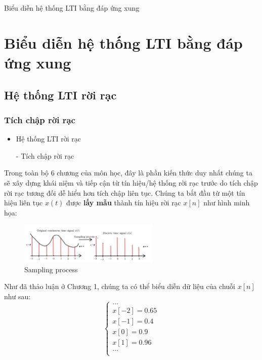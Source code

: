 \documentclass[8pt]{beamer}
\begin{document}
\begin{frame}{Biểu diễn hệ thống LTI bằng đáp ứng xung}
\section{Biểu diễn hệ thống LTI bằng đáp ứng xung}
\subsection{Hệ thống LTI rời rạc}
\subsubsection{Tích chập rời rạc}
\begin{itemize}
	\item Hệ thống LTI rời rạc
\end{itemize}

\begin{itemize}
	\item[-] Tích chập rời rạc
\end{itemize}
Trong toàn bộ $6$ chương của môn học, đây là phần kiến thức duy nhất chúng ta sẽ xây dựng khái niệm và tiếp cận từ tín hiệu/hệ thống rời rạc trước do tích chập rời rạc tương đối dễ hiểu hơn tích chập liên tục. Chúng ta bắt đầu từ một tín hiệu liên tục $x(t)$ được \textbf{lấy mẫu} thành tín hiệu rời rạc $x[n]$ như hình minh họa:
 \begin{figure}[h]
			\includegraphics[width=0.6\textwidth]{discrete.jpg}
			\caption{Sampling process}			\label{fig:re1}
		\end{figure}
Như đã thảo luận ở \alert{Chương 1}, chúng ta có thể biểu diễn dữ liệu của chuỗi $x[n]$ như sau:
\begin{equation*}
	\begin{cases}
		\dots \\
		x[-2]=0.65\\
		x[-1]=0.4\\
		x[0]=0.9\\
		x[1]=0.96\\
		\dots \\
	\end{cases}
\end{equation*}
\end{frame}
\end{document}
